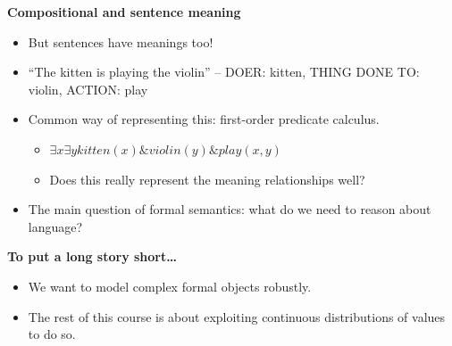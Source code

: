 \documentclass{beamer}
\newcommand{\pagestepalt}[2]{
  \begin{frame}[t]
    \begin{minipage}[t][0.26\textheight][t]{\textwidth}
      \begin{center}
        \huge
        \textbf{#1}
      \end{center}
    \end{minipage}
    
    \begin{minipage}[t][0.7\textheight][c]{\textwidth}
      #2
    \end{minipage}
  \end{frame}
}
\begin{document}
\pagestepalt{Compositional and sentence meaning}{
  \begin{itemize}
  \item But sentences have meanings too! \pause
  \item ``The kitten is playing the violin'' -- DOER: kitten, THING DONE TO: violin, ACTION: play\pause
  \item Common way of representing this: first-order predicate calculus.\pause
    \begin{itemize}
    \item $\exists x \exists y \mathit{kitten}(x) \& \mathit{violin}(y) \& \mathit{play}(x, y)$\pause
    \item Does this really represent the meaning relationships well?\pause
    \end{itemize}
  \item The main question of formal semantics: what do we need to reason about language?
  \end{itemize}
}

\pagestepalt{To put a long story short\ldots}{
  \begin{itemize}
  \item We want to \alert{model} complex formal objects \alert{robustly}.
  \item The rest of this course is about exploiting \alert{continuous distributions of values} to do so.
  \end{itemize}
}
\end{document}
